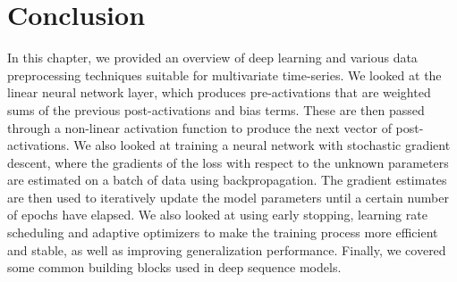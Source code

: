 \documentclass{statsmsc}
\begin{document}
{%





\section{Conclusion}%
\label{sec:Conclusion}%

In this chapter, we provided an overview of deep learning and various data preprocessing techniques
suitable for multivariate time-series. We looked at the linear neural network layer, which
produces pre-activations that are weighted sums of the previous post-activations and bias terms.
These are then passed through a non-linear activation function to produce the next vector of
post-activations. We also looked at training a neural network with stochastic gradient descent,
where the gradients of the loss with respect to the unknown parameters are estimated on a batch of
data using backpropagation. The gradient estimates are then used to iteratively update the model
parameters until a certain number of epochs have elapsed. We also looked at using early stopping,
learning rate scheduling and adaptive optimizers to make the training process more efficient and
stable, as well as improving generalization performance. Finally, we covered some common building
blocks used in deep sequence models.

}
\end{document}
